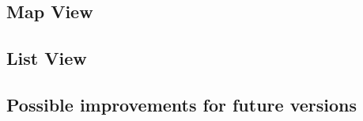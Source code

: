 \subsection{Map View}

\subsection{List View}

\subsection{Possible improvements for future versions}

\newpage